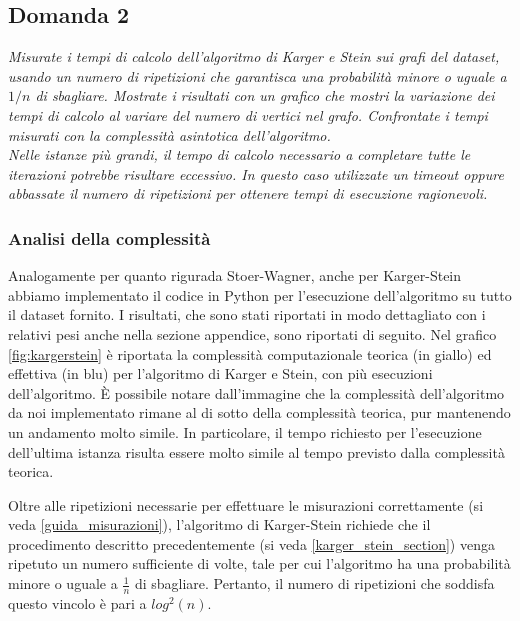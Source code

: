 \subsection{Domanda 2}
\textit{Misurate i tempi di calcolo dell'algoritmo di Karger e Stein sui grafi del dataset, usando un numero di ripetizioni che garantisca una probabilità minore o uguale a $1/n$ di sbagliare. Mostrate i risultati con un grafico che mostri la variazione dei tempi di calcolo al variare del numero di vertici nel grafo. Confrontate i tempi misurati con la complessità asintotica dell'algoritmo. \\
Nelle istanze più grandi, il tempo di calcolo necessario a completare tutte le iterazioni potrebbe risultare eccessivo. In questo caso utilizzate un timeout oppure abbassate il numero di ripetizioni per ottenere tempi di esecuzione ragionevoli.}

\subsubsection{Analisi della complessità}

Analogamente per quanto rigurada Stoer-Wagner, anche per Karger-Stein abbiamo 
implementato il codice in Python per l'esecuzione dell'algoritmo su tutto il dataset 
fornito. I risultati, che sono stati riportati in modo dettagliato con i relativi pesi 
anche nella sezione appendice, sono riportati di seguito.
Nel grafico \ref{fig:kargerstein} è riportata la complessità 
computazionale teorica (in giallo) ed effettiva (in blu) per l'algoritmo di Karger e 
Stein, con più esecuzioni dell'algoritmo. È possibile notare dall'immagine che la 
complessità dell'algoritmo da noi implementato rimane al di sotto della complessità 
teorica, pur mantenendo un andamento molto simile. In particolare, il tempo richiesto 
per l'esecuzione dell'ultima istanza risulta essere molto simile al tempo previsto 
dalla complessità teorica.

Oltre alle ripetizioni necessarie per effettuare le misurazioni correttamente 
(si veda \ref{guida_misurazioni}), l'algoritmo di Karger-Stein richiede che il 
procedimento descritto precedentemente (si veda \ref{karger_stein_section}) venga 
ripetuto un numero sufficiente di volte, tale per cui l'algoritmo ha una probabilità 
minore o uguale a $\frac{1}{n}$ di sbagliare. Pertanto, il numero di ripetizioni che 
soddisfa questo vincolo è pari a $log^{2}(n)$.

